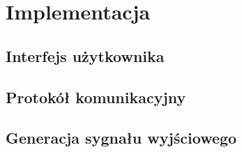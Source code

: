 \section{Implementacja}
\subsection{Interfejs użytkownika}

\subsection{Protokół komunikacyjny}

\subsection{Generacja sygnału wyjściowego}
